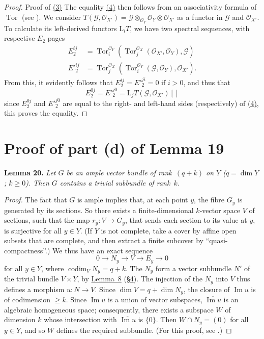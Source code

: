 \documentclass{article}
\newenvironment{itenv}[1]
  {\phantomsection\par\medskip\noindent\textbf{#1.}\itshape}
  {\medskip}
\newcommand{\scr}[1]{{\mathscr{#1}}}
\newcommand{\LL}{\mathrm{L}}
\renewcommand{\geq}{\geqslant}
\DeclareMathOperator{\Tor}{Tor}
\DeclareMathOperator{\codim}{codim}
\newcommand{\oldpage}[1]{\marginpar{\footnotesize$\Big\vert$ \textit{p.~#1}}}
\begin{document}
\begin{proof}{Proof of {\hyperref[section15equation3]{(3)}}}
  The equality \hyperref[section15equation4]{(4)} then follows from an associativity formula of $\Tor$ (see \cite[p.~345]{3}).
  We consider $T(\scr{G},\scr{O}_{X'}) = \scr{G}\otimes_{\scr{O}_Y}\scr{O}_Y\otimes\scr{O}_{X'}$ as a functor in $\scr{G}$ and $\scr{O}_{X'}$.
  To calculate its left-derived functors $\LL_iT$, we have two spectral sequences, with respective $E_2$ pages
  \begin{align*}
    E_2^{ij} &= \Tor_i^{\scr{O}_Y}(\Tor_j^{\scr{O}_X}(\scr{O}_{X'},\scr{O}_Y),\scr{G})
  \\E'^{ij}_2 &= \Tor_j^{\scr{O}_X}(\Tor_i^{\scr{O}_Y}(\scr{G},\scr{O}_Y),\scr{O}_{X'}).
  \end{align*}
  From this, it evidently follows that $E_2^{ij}=E'^{ji}_2=0$ if $i>0$, and thus that
  \[
    E_2^{0j} = E'^{j0}_2 = \LL_jT(\scr{G},\scr{O}_{X'})[]
  \]
  since $E_2^{0j}$ and $E'^{j0}_2$ are equal to the right- and left-hand sides (respectively) of \hyperref[section15equation4]{(4)}, this proves the equality.
\end{proof}


\section{Proof of part (d) of Lemma 19}
\label{section16}

\begin{itenv}{Lemma 20}
\label{lemma20}
  Let $G$ be an ample vector bundle of rank~$(q+k)$ on $Y$ ($q=\dim Y$; $k\geq0$).
  Then $G$ contains a trivial subbundle of rank~$k$.
\end{itenv}

\begin{proof}
  The fact that $G$ is ample implies that, at each point $y$, the fibre $G_y$ is generated by its sections.
  So there exists a finite-dimensional $k$-vector space $V$ of sections, such that the map $r_y\colon V\to G_y$, that sends each section to its value at $y$, is surjective for all $y\in Y$.
  (If $Y$ is not complete, take a cover by affine open subsets that are complete, and then extract a finite subcover by ``quasi-compactness''.)
  We thus have an exact sequence
  \[
    0 \to N_y \to V \to E_y \to 0
  \]
\oldpage{133}
  for all $y\in Y$, where $\codim_V N_y=q+k$.
  The $N_y$ form a vector subbundle $N'$ of the trivial bundle $V\times Y$, by \hyperref[lemma8]{Lemma~8} (\hyperref[section4]{\S4}).
  The injection of the $N_y$ into $V$ thus defines a morphism $u\colon N\to V$.
  Since $\dim V=q+\dim N_y$, the closure of $\operatorname{Im}u$ is of codimension $\geq k$.
  Since $\operatorname{Im}u$ is a union of vector subspaces, $\overline{\operatorname{Im}u}$ is an algebraic homogeneous space;
  consequently, there exists a subspace $W$ of dimension $k$ whose intersection with $\overline{\operatorname{Im}u}$ is $\{0\}$.
  Then $W\cap N_y=(0)$ for all $y\in Y$, and so $W$ defines the required subbundle.
  (For this proof, see \cite{1}.)
\end{proof}
\end{document}
